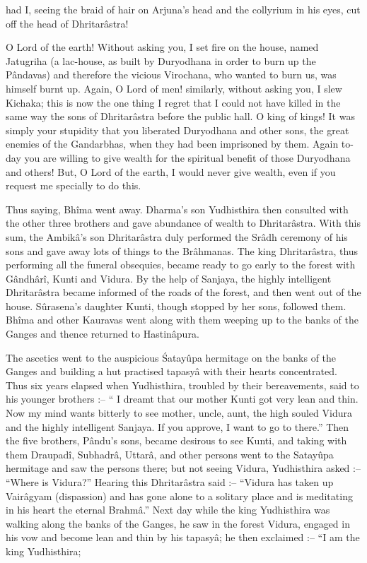 had I, seeing the braid of hair on Arjuna's head and the collyrium in his eyes, cut off the head of Dhritar\^astra!

O Lord of the earth! Without asking you, I set fire on the house, named Jatugriha (a lac-house, as built by Duryodhana in order to burn up the P\^andavas) and therefore the vicious Virochana, who wanted to burn us, was himself burnt up. Again, O Lord of men! similarly, without asking you, I slew Kichaka; this is now the one thing I regret that I could not have killed in the same way the sons of Dhritar\^astra before the public hall. O king of kings! It was simply your stupidity that you liberated Duryodhana and other sons, the great enemies of the Gandarbhas, when they had been imprisoned by them. Again to-day you are willing to give wealth for the spiritual benefit of those Duryodhana and others! But, O Lord of the earth, I would never give wealth, even if you request me specially to do this.

Thus saying, Bh\^ima went away. Dharma's son Yudhisthira then consulted with the other three brothers and gave abundance of wealth to Dhritar\^astra. With this sum, the Ambik\^a's son Dhritar\^astra duly performed the Sr\^adh ceremony of his sons and gave away lots of things to the Br\^ahmanas. The king Dhritar\^astra, thus performing all the funeral obsequies, became ready to go early to the forest with G\^andh\^ar\^i, Kunti and Vidura. By the help of Sanjaya, the highly intelligent Dhritar\^astra became informed of the roads of the forest, and then went out of the house. S\^urasena's daughter Kunti, though stopped by her sons, followed them. Bh\^ima and other Kauravas went along with them weeping up to the banks of the Ganges and thence returned to Hastin\^apura.

The ascetics went to the auspicious \'Satay\^upa hermitage on the banks of the Ganges and building a hut practised tapasy\^a with their hearts concentrated. Thus six years elapsed when Yudhisthira, troubled by their bereavements, said to his younger brothers :-- `` I dreamt that our mother Kunti got very lean and thin. Now my mind wants bitterly to see mother, uncle, aunt, the high souled Vidura and the highly intelligent Sanjaya. If you approve, I want to go to there.'' Then the five brothers, P\^andu's sons, became desirous to see Kunti, and taking with them Draupad\^i, Subhadr\^a, Uttar\^a, and other persons went to the Satay\^upa hermitage and saw the persons there; but not seeing Vidura, Yudhisthira asked :-- ``Where is Vidura?'' Hearing this Dhritar\^astra said :-- ``Vidura has taken up Vair\^agyam (dispassion) and has gone alone to a solitary place and is meditating in his heart the eternal Brahm\^a.'' Next day while the king Yudhisthira was walking along the banks of the Ganges, he saw in the forest Vidura, engaged in his vow and become lean and thin by his tapasy\^a; he then exclaimed :-- ``I am the king Yudhisthira;

